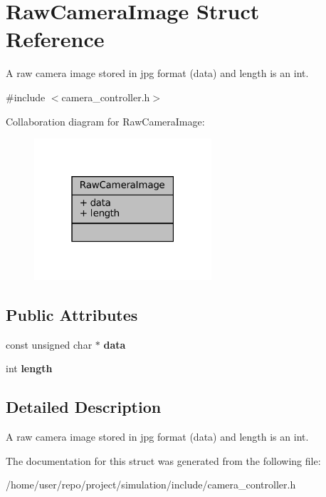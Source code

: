 \hypertarget{structRawCameraImage}{}\section{Raw\+Camera\+Image Struct Reference}
\label{structRawCameraImage}


A raw camera image stored in jpg format (data) and length is an int.  




{\ttfamily \#include $<$camera\+\_\+controller.\+h$>$}



Collaboration diagram for Raw\+Camera\+Image\+:\nopagebreak
\begin{figure}[H]
\begin{center}
\leavevmode
\includegraphics[width=187pt]{structRawCameraImage__coll__graph}
\end{center}
\end{figure}
\subsection*{Public Attributes}
\begin{DoxyCompactItemize}
\item 
\mbox{\label{structRawCameraImage_a7ba5f41faad645c65d7b77be40fd95d0}} 
const unsigned char $\ast$ {\bfseries data}
\item 
\mbox{\label{structRawCameraImage_a628b5c2cf0823c084377e8f5ea502906}} 
int {\bfseries length}
\end{DoxyCompactItemize}


\subsection{Detailed Description}
A raw camera image stored in jpg format (data) and length is an int. 

The documentation for this struct was generated from the following file\+:\begin{DoxyCompactItemize}
\item 
/home/user/repo/project/simulation/include/camera\+\_\+controller.\+h\end{DoxyCompactItemize}
